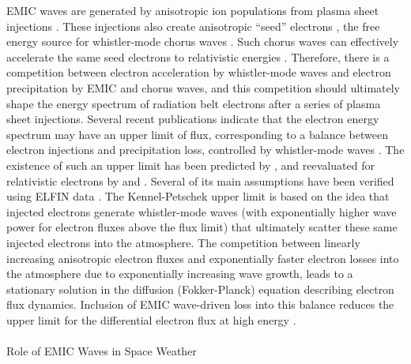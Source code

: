 \documentclass[
  letterpaper,
  DIV=11,
  numbers=noendperiod]{scrartcl}
\makeatletter
\let\oldparagraph\paragraph
\renewcommand{\paragraph}{
    \@ifstar
      \xxxParagraphStar
      \xxxParagraphNoStar
  }
\newcommand{\xxxParagraphStar}[1]{\oldparagraph*{#1}\mbox{}}
\newcommand{\xxxParagraphNoStar}[1]{\oldparagraph{#1}\mbox{}}
\makeatother
\begin{document}
EMIC waves are generated by anisotropic ion populations from plasma sheet injections \citep{Jun19:emic}. These injections also create anisotropic ``seed'' electrons \citep{Miyoshi13,Jaynes15:seedelectrons}, the free energy source for whistler-mode chorus waves \citep{Tao11,Fu14:radiation_belts,Zhang18:whistlers&injections}. Such chorus waves can effectively accelerate the same seed electrons to relativistic energies \citep{miyoshiRebuildingProcessOuter2003, thorneRapidLocalAcceleration2013, mourenasApproximateAnalyticalSolutions2014, allisonLocalHeatingRadiation2020}. Therefore, there is a competition between electron acceleration by whistler-mode waves \citep[supported by direct adiabatic heating during injections, see, e.g.][]{sorathiaModelingDepletionRecovery2018} and electron precipitation by EMIC and chorus waves, and this competition should ultimately shape the energy spectrum of radiation belt electrons after a series of plasma sheet injections. Several recent publications indicate that the electron energy spectrum may have an upper limit of flux, corresponding to a balance between electron injections and precipitation loss, controlled by whistler-mode waves \citep{oliferTaleTwoRadiation2021, oliferNaturalLimitSpectral2022}. The existence of such an upper limit has been predicted by \citet{kennelLimitStablyTrapped1966}, and reevaluated for relativistic electrons by \citet{summersLimitStablyTrapped2009} and \citet{summersLimitingEnergySpectrum2014}. Several of its main assumptions have been verified using ELFIN data \citep{mourenasCheckingKeyAssumptions2024}. The Kennel-Petschek upper limit is based on the idea that injected electrons generate whistler-mode waves (with exponentially higher wave power for electron fluxes above the flux limit) that ultimately scatter these same injected electrons into the atmosphere. The competition between linearly increasing anisotropic electron fluxes and exponentially faster electron losses into the atmosphere due to exponentially increasing wave growth, leads to a stationary solution in the diffusion (Fokker-Planck) equation describing electron flux dynamics. Inclusion of EMIC wave-driven loss into this balance reduces the upper limit for the differential electron flux at high energy \citep{mourenasExtremeEnergySpectra2022}.

\paragraph{Role of EMIC Waves in Space Weather}\label{role-of-emic-waves-in-space-weather}
\end{document}
